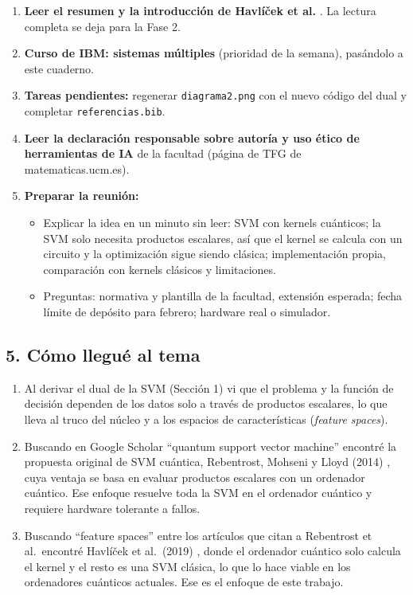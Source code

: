 \documentclass[12pt, a4paper]{article}
\begin{document}
\begin{enumerate}
    \item \textbf{Leer el resumen y la introducción de Havlíček et al.} \cite{havlicek2019supervised}. La lectura completa se deja para la Fase 2.
    \item \textbf{Curso de IBM: sistemas múltiples} (prioridad de la semana), pasándolo a este cuaderno.
    \item \textbf{Tareas pendientes:} regenerar \texttt{diagrama2.png} con el nuevo código del dual y completar \texttt{referencias.bib}.
    \item \textbf{Leer la declaración responsable sobre autoría y uso ético de herramientas de IA} de la facultad (página de TFG de matematicas.ucm.es).
    \item \textbf{Preparar la reunión:}
    \begin{itemize}
        \item Explicar la idea en un minuto sin leer: SVM con kernels cuánticos; la SVM solo necesita productos escalares, así que el kernel se calcula con un circuito y la optimización sigue siendo clásica; implementación propia, comparación con kernels clásicos y limitaciones.
        \item Preguntas: normativa y plantilla de la facultad, extensión esperada; fecha límite de depósito para febrero; hardware real o simulador.
    \end{itemize}
\end{enumerate}

\subsection*{5. Cómo llegué al tema}

\begin{enumerate}
    \item Al derivar el dual de la SVM (Sección 1) vi que el problema y la función de decisión dependen de los datos solo a través de productos escalares, lo que lleva al truco del núcleo y a los espacios de características (\textit{feature spaces}).
    \item Buscando en Google Scholar ``quantum support vector machine'' encontré la propuesta original de SVM cuántica, Rebentrost, Mohseni y Lloyd (2014) \cite{rebentrost2014quantum}, cuya ventaja se basa en evaluar productos escalares con un ordenador cuántico. Ese enfoque resuelve toda la SVM en el ordenador cuántico y requiere hardware tolerante a fallos.
    \item Buscando ``feature spaces'' entre los artículos que citan a Rebentrost et al.\ encontré Havlíček et al.\ (2019) \cite{havlicek2019supervised}, donde el ordenador cuántico solo calcula el kernel y el resto es una SVM clásica, lo que lo hace viable en los ordenadores cuánticos actuales. Ese es el enfoque de este trabajo.
\end{enumerate}
\end{document}
